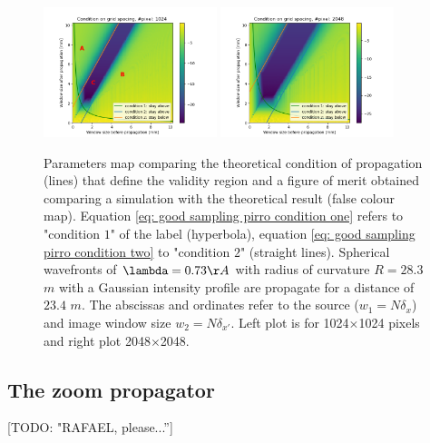 \documentclass{iucr}              %
\newcommand{\todo}[1]{{\color{red}[TODO: "#1'']}}
\begin{document}
\begin{figure}
\label{fig: comparison validity conditions R=28.3}
\caption{
Parameters map comparing the theoretical condition of propagation (lines) that define the validity region and a figure of merit obtained comparing a simulation with the theoretical result (false colour map). Equation \ref{eq: good sampling pirro condition one} refers to
"condition $1$" of the label (hyperbola), equation \ref{eq: good sampling pirro condition two} to "condition $2$" (straight lines). Spherical wavefronts of $\lambda=0.73 \AA$ with radius of curvature $R = 28.3$ $m$ with a Gaussian intensity profile are propagate for a distance of $23.4$ $m$. The abscissas and ordinates refer to the source ($w_1=N \delta_x$) and image window size $w_2 = N \delta_{x'}$. Left plot is for 1024$\times$1024 pixels and right plot 2048$\times$2048. 
}
\includegraphics[width=0.45\textwidth]{npixel1024-prop_dist23-R28-Finf_con_zone.png}
\includegraphics[width=0.45\textwidth]{npixel2048-prop_dist23-R28-Finf.png}
\end{figure}

\subsection{The zoom propagator}
\todo{RAFAEL, please...}
\end{document}
